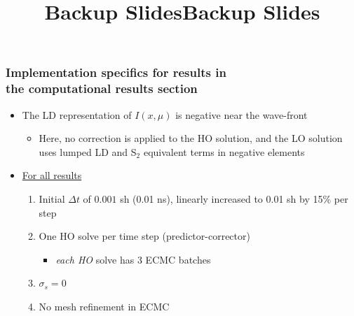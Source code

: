 \documentclass[xcolor=dvipsnames,hyperref={pdfpagelabels=false},unknownkeysallowed]{beamer}
\renewcommand{\u}[1]{\underline{#1}}
\newlength{\wideitemsep}
\let\olditem\item
\renewcommand{\item}{\setlength{\itemsep}{\wideitemsep}\olditem}
\begin{document}
\date{}
\title{Backup Slides}
\begin{frame}
    \vspace{-0.21in}
    \titlepage \vspace{-0.2113in}
\end{frame}

\appendix
{}
\setcounter{finalframe}{\value{framenumber}}

\title{Backup Slides}
\author{}
\date{}
\begin{frame}
    \frametitle{Implementation specifics for results in  \\ the computational
                results section }
    \begin{itemize}
    \item The LD representation of $I(x,\mu)$ is negative near the wave-front
        \begin{itemize}
            \item Here, no correction is applied to the HO solution, and the LO
                solution uses lumped LD and S$_2$ equivalent terms in negative elements
        \end{itemize}
     
 \item \u{For all results}
        \begin{enumerate}
    \item Initial $\Delta t$ of $0.001$ sh (0.01 ns), linearly increased to 0.01 sh by 15\% per step
    \item One HO solve per time step (predictor-corrector)
        \begin{itemize}
            \item \emph{each HO} solve has 3 ECMC batches
        \end{itemize}
    \item $\sigma_s=0$
    \item No mesh refinement in ECMC
    \end{enumerate} 
    \end{itemize}
\end{frame}
\end{document}
